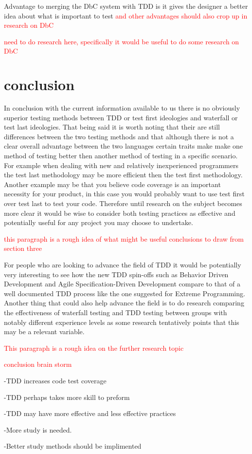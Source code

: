 \documentclass{sig-alternate}
\newcommand{\mycomment}[1]{\textcolor{red}{#1}}
\begin{document}
Advantage to merging the DbC system with TDD is it gives the designer a better idea about what is important to test \mycomment{and other advantages should also crop up in research on DbC}

\mycomment{need to do research here, specifically it would be useful to do some research on DbC}
\section{conclusion}
In conclusion with the current information available to us there is no obviously superior testing methods between TDD or test first ideologies and waterfall or test last ideologies.  That being said it is worth noting that their are still differences between the two testing methods and that although there is not a clear overall advantage between the two languages certain traits make make one method of testing better then another method of testing in a specific scenario.  For example when dealing with new and relatively inexperienced programmers the test last methodology may be more efficient then the test first methodology.  Another example may be that you believe code coverage is an important necessity for your product, in this case you would probably want to use test first over test last to test your code.  Therefore until research on the subject becomes more clear it would be wise to consider both testing practices as effective and potentially useful for any project you may choose to undertake.

\mycomment{this paragraph is a rough idea of what might be useful conclusions to draw from section three}

For people who are looking to advance the field of TDD it would be potentially very interesting to see how the new TDD spin-offs such as Behavior Driven Development and Agile Specification-Driven Development compare to that of a well documented TDD process like the one suggested for Extreme Programming.  Another thing that could also help advance the field is to do research comparing the effectiveness of waterfall testing and TDD testing between groups with notably different experience levels as some research tentatively points that this may be a relevant variable.

\mycomment{This paragraph is a rough idea on the further research topic}

\mycomment{conclusion brain storm}

-TDD increases code test coverage

-TDD perhaps takes more skill to preform

-TDD may have more effective and less effective practices

-More study is needed.

-Better study methods should be implimented


  
\end{document}
